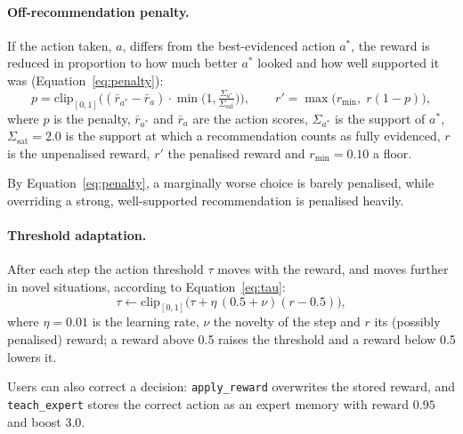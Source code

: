 \documentclass[12pt,a4paper,oneside]{report}
\newcommand{\code}[1]{\texttt{\small #1}}
\begin{document}
\paragraph{Off-recommendation penalty.} If the action taken, $a$, differs from the best-evidenced action $a^*$, the reward is reduced in proportion to how much better $a^*$ looked and how well supported it was (Equation~\eqref{eq:penalty}):
\begin{equation}
  p = \mathrm{clip}_{[0,1]}\Big((\bar r_{a^*} - \bar r_a)\cdot \min\big(1, \tfrac{\Sigma_{a^*}}{\Sigma_{\text{sat}}}\big)\Big), \qquad r' = \max\big(r_{\min},\; r(1-p)\big),
  \label{eq:penalty}
\end{equation}
where $p$ is the penalty, $\bar r_{a^*}$ and $\bar r_a$ are the action scores, $\Sigma_{a^*}$ is the support of $a^*$, $\Sigma_{\text{sat}} = 2.0$ is the support at which a recommendation counts as fully evidenced, $r$ is the unpenalised reward, $r'$ the penalised reward and $r_{\min} = 0.10$ a floor.

By Equation~\eqref{eq:penalty}, a marginally worse choice is barely penalised, while overriding a strong, well-supported recommendation is penalised heavily.

\paragraph{Threshold adaptation.} After each step the action threshold $\tau$ moves with the reward, and moves further in novel situations, according to Equation~\eqref{eq:tau}:
\begin{equation}
  \tau \leftarrow \mathrm{clip}_{[0,1]}\big(\tau + \eta\,(0.5 + \nu)(r - 0.5)\big),
  \label{eq:tau}
\end{equation}
where $\eta = 0.01$ is the learning rate, $\nu$ the novelty of the step and $r$ its (possibly penalised) reward; a reward above 0.5 raises the threshold and a reward below 0.5 lowers it.

Users can also correct a decision: \code{apply\_reward} overwrites the stored reward, and \code{teach\_expert} stores the correct action as an expert memory with reward $0.95$ and boost $3.0$.
\end{document}
